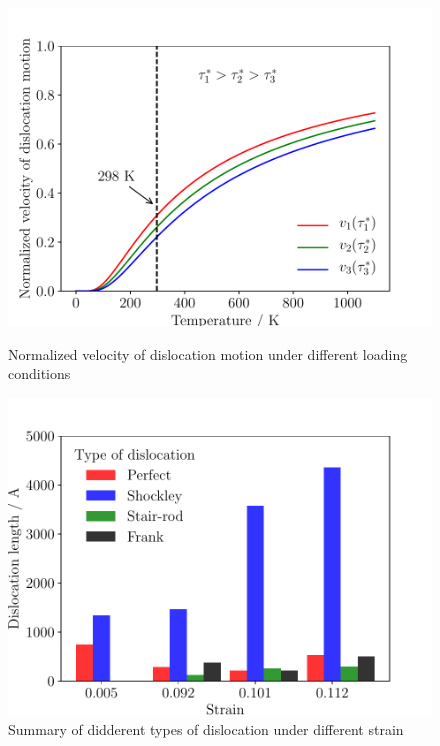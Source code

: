 \documentclass[materials,article,submit,moreauthors,pdftex,10pt,a4paper]{Definitions/mdpi}
\begin{document}
\begin{figure}[ht]
	\centering
	\begin{minipage}{0.495\textwidth}
		\includegraphics[width=1\linewidth]{img/temp}
		\centering
		\caption{Normalized velocity of dislocation motion under different loading conditions}
		\label{fig:temp}
	\end{minipage}	
	\hfill
	\begin{minipage}{0.495\textwidth}		
		\includegraphics[width=1\linewidth]{img/dis-summary}
		\centering
		\caption{Summary of didderent types of dislocation under different strain }
		\label{fig:disum}
	\end{minipage}
\end{figure}
\end{document}
